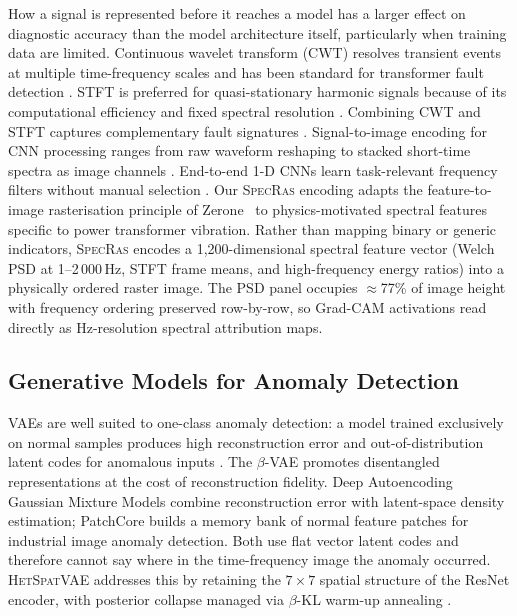 \documentclass[preprint,12pt,3p]{elsarticle}
\let\cite\citep   %
\newcommand{\zerone}{\textsc{SpecRas}\xspace}      %
\newcommand{\hetspatvae}{\textsc{HetSpatVAE}\xspace} %
\newcommand{\hczv}{\hetspatvae}                    %
\begin{document}
How a signal is represented before it reaches a model has a larger effect
on diagnostic accuracy than the model architecture itself, particularly
when training data are limited.
Continuous wavelet transform (CWT) resolves transient events at multiple
time-frequency scales and has been standard for transformer fault detection
\cite{peng2004wavelet}.
STFT is preferred for quasi-stationary harmonic signals because of its
computational efficiency and fixed spectral resolution
\cite{cohen1995tfa}.
Combining CWT and STFT captures complementary fault signatures
\cite{lei2020review}.
Signal-to-image encoding for CNN processing ranges from raw waveform
reshaping \cite{wen2018cnn} to stacked short-time spectra
as image channels \cite{zhao2019deep}.
End-to-end 1-D CNNs learn task-relevant frequency filters without
manual selection \cite{guo2019transfer}.
Our \zerone encoding adapts the feature-to-image rasterisation principle
of Zerone~\cite{kim2025zerone} to physics-motivated spectral
features specific to power transformer vibration.
Rather than mapping binary or generic indicators, \zerone encodes a
1{,}200-dimensional spectral feature vector (Welch PSD at
1--2\,000\,Hz, STFT frame means, and high-frequency energy ratios)
into a physically ordered raster image.
The PSD panel occupies $\approx$77\% of image height with frequency
ordering preserved row-by-row, so Grad-CAM activations read directly
as Hz-resolution spectral attribution maps.

\subsection{Generative Models for Anomaly Detection}

VAEs \cite{kingma2013auto} are well suited to one-class anomaly
detection: a model trained exclusively on normal samples produces high
reconstruction error and out-of-distribution latent codes for anomalous
inputs \cite{an2015variational}.
The $\beta$-VAE \cite{higgins2017betavae} promotes disentangled
representations at the cost of reconstruction fidelity.
Deep Autoencoding Gaussian Mixture Models \cite{zong2018deep} combine
reconstruction error with latent-space density estimation; PatchCore
\cite{roth2022towards} builds a memory bank of normal feature patches
for industrial image anomaly detection.
Both use flat vector latent codes and therefore cannot say where in the
time-frequency image the anomaly occurred.
\hczv addresses this by retaining the $7{\times}7$ spatial structure
of the ResNet encoder, with posterior collapse managed via $\beta$-KL
warm-up annealing \cite{lucas2019posterior}.
\end{document}
